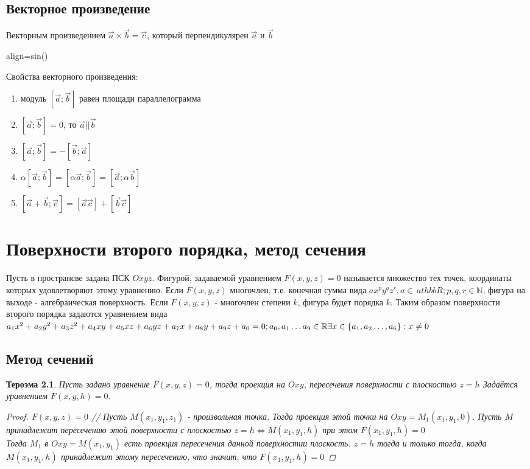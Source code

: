 \documentclass[oneside]{book}
\newcommand{\boxedeq}[2]{\begin{empheq}[box={\fboxsep=6pt\fbox}]{align}\label{#1}#2\end{empheq}}
\newtheorem{thm}{Тероэма}[chapter] %
\begin{document}
\begin{enumerate}
\begin{itemize}
\begin{enumerate}
\section{Векторное произведение}
Векторным произведением $\vec{a}\times\vec{b}=\vec{c}$, который перпендикулярен  $$ и $$
\boxedeq{eq:*}{=\mid\vec{a}\vec{b}\mid sin(\phi)}

Свойства векторного произведения:
\begin{enumerate}
	\item модуль $[\vec{a};\vec{b}]$ равен площади параллелограмма 
	\item $[\vec{a};\vec{b}]=0$, то $\vec{a}||\vec{b}$ 
	\item $[\vec{a};\vec{b}]=-[\vec{b};\vec{a}]$
	\item  $\alpha[\vec{a};\vec{b}]=[\alpha\vec{a};\vec{b}]=[\vec{a};\alpha\vec{b}]$
	\item $[\vec{a}+\vec{b};\vec{c}]=[\vec{a}\vec{c}]+[\vec{b}\vec{c}]$
\end{enumerate}

\setcounter{chapter}{45}
\chapter{Поверхности второго порядка, метод сечения}

 Пусть в пространсве задана ПСК $Oxyz$. Фигурой, задаваемой уравнением $F(x, y, z) = 0$ называется множество тех
 точек, координаты которых удовлетворяют этому уравнению.
 Если  $F(x, y, z)$ многочлен, т.е. конечная сумма вида $ax^p y^q z^r, a \in \,athbb{R}; p, q, r \in \mathbb{N}$, фигура на выходе -
 алгебраическая поверхность. Если  $F(x, y, z)$  - многочлен степени $k$, фигура будет порядка $k$. Таким образом поверхности второго порядка
 задаются уравнением вида $a_1 x^2 + a_2 y^2 + a_3 z^2 + a_4 xy + a_5  xz + a_6 yz  + a_7 x + a_8 y + a_9 z + a_0 = 0; \\ a_0, a_1 \dots a_9 \in \mathbb{R} \\ \exists x \in \{a_1, a_2 \dots, a_6\}: x \neq 0$

\section{Метод сечений}
\begin{thm}
  Пусть задано уравнение  $F(x, y, z) = 0$, тогда проекция на $Oxy$, пересечения поверхности с плоскостью $z = h$ Задаётся уравнением  $F(x, y, h) = 0$.
  \begin{proof}
     $F(x, y, z) = 0$ //
     Пусть $M(x_1, y_1, z_1)$ - произвольная точка. Тогда проекция этой точки на $Oxy = M_1(x_1, y_1, 0)$.
     Пусть $M$ принадлежит пересечению этой поверхности с  плоскостью $z = h \Leftrightarrow M(x_1, y_1, h)$ при этом  $F(x_1, y_1, h) = 0$\\
     Тогда $M_1$ в $Oxy = M(x_1, y_1)$ есть проекция пересечения данной поверхностии плоскость. $z = h$ тогда и только тогда, когда
     $M(x_1, y_1, h)$ принадлежит этому пересечению, что значит, что $F(x_1, y_1, h) = 0$
   \end{proof}
\end{thm}
\setcounter{chapter}{46}

\end{enumerate}
\end{itemize}
\end{enumerate}
\end{document}

